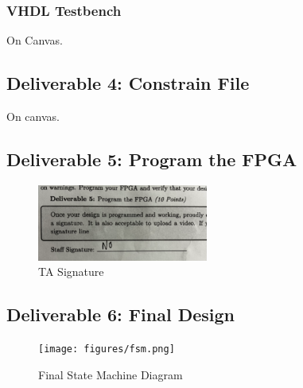 \documentclass[10pt]{article}
\begin{document}
\subsubsection*{VHDL Testbench}

On Canvas.

\subsection*{Deliverable 4: Constrain File}

On canvas.

\subsection*{Deliverable 5: Program the FPGA}

\begin{figure} [H]
  \center
  \includegraphics[width=0.5\textwidth]{figures/signature.png}
  \caption{TA Signature}
\end{figure}

\subsection*{Deliverable 6: Final Design}

\begin{figure} [H]
  \center
  \texttt{[image: figures/fsm.png]}
  \caption{Final State Machine Diagram}
\end{figure}
\end{document}
